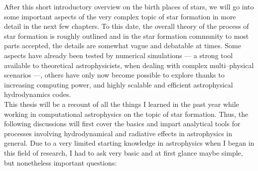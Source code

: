 After this short introductory overview on the birth places of stars, we will go into some important aspects of the very complex topic of star formation in more detail in the next few chapters.
To this date, the overall theory of the process of star formation is roughly outlined and in the star formation community to most parts accepted, the details are somewhat vague and debatable at times.
Some aspects have already been tested by numerical simulations --- a strong tool available to theoretical astrophysicists, when dealing with complex multi--physical scenarios ---, others have only now become possible to explore thanks to increasing computing power, and highly scalable and efficient astrophysical hydrodynamics codes.
\\[6pt]
%
This thesis will be a recount of all the things I learned in the past year while working in computational astrophysics on the topic of star formation.
Thus, the following discussions will first cover the basics and impart analytical tools for processes involving hydrodynamical and radiative effects in astrophysics in general.
Due to a very limited starting knowledge in astrophysics when I began in this field of research, I had to ask very basic and at first glance maybe simple, but nonetheless important questions:
\\[-9pt]
